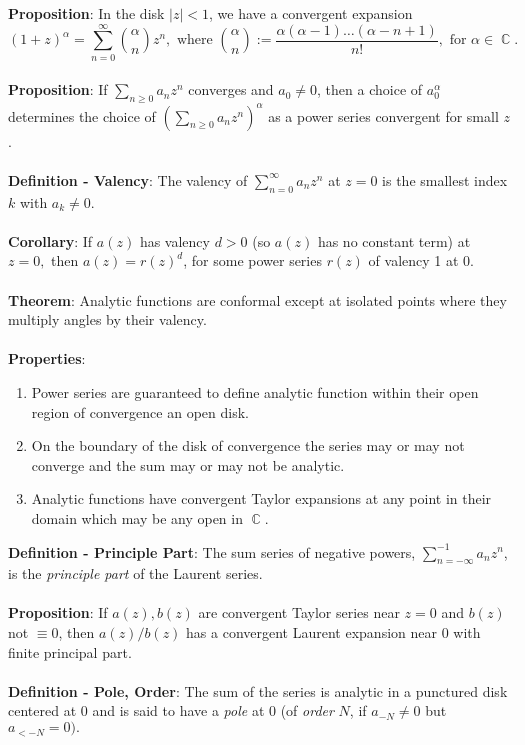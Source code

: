 \documentclass{article}
\DeclareMathOperator{\C}{\mathbb{C}}
\begin{document}
\textbf{Proposition}: In the disk $|z| < 1$, we have a convergent expansion $$(1 + z)^\alpha = \sum_{n = 0}^\infty {\alpha \choose n} z^n, \text{ where } {\alpha \choose n} := \frac{\alpha(\alpha - 1)\dots (\alpha - n + 1)}{n!}, \text{ for } \alpha \in \C.$$ \\
\textbf{Proposition}: If $\sum_{n \geq 0} a_n z^n$ converges and $a_0 \neq 0$, then a choice of $a_0^\alpha$ determines the choice of $(\sum_{n \geq 0} a_n z^n)^\alpha$ as a power series convergent for small $z$. \\ \\
\textbf{Definition - Valency}: The valency of $\sum_{n = 0}^\infty a_n z^n$ at $z = 0$ is the smallest index $k$ with $a_k \neq 0.$ \\ \\
\textbf{Corollary}: If $a(z)$ has valency $d > 0$ (so $a(z)$ has no constant term) at $z = 0,$ then $a(z) = r(z)^d$, for some power series $r(z)$ of valency 1 at 0. \\ \\
\textbf{Theorem}: Analytic functions are conformal except at
isolated points where they multiply angles by their valency. \\ \\
\textbf{Properties}: \begin{enumerate}
    \item Power series are guaranteed to define analytic function within their open region of convergence an open disk.
    \item On the boundary of the disk of convergence the series may or may not converge and the sum may or may not be analytic.
    \item Analytic functions have convergent Taylor expansions at any point in their domain which may be any open in $\C$.
\end{enumerate} $ $ \\
\textbf{Definition - Principle Part}: The sum series of negative powers, $\sum_{n = -\infty}^{-1} a_n z^n$, is the \textit{principle part} of the Laurent series. \\ \\
\textbf{Proposition}: If $a(z), b(z)$ are convergent Taylor series near $z = 0$ and $b(z)$ not $\equiv 0$, then $a(z)/b(z)$ has a convergent Laurent expansion near 0 with finite principal part. \\ \\
\textbf{Definition - Pole, Order}: The sum of the series is analytic in a punctured disk centered at 0 and is said to have a \textit{pole} at 0 (of \textit{order} $N$, if $a_{-N} \neq 0$ but $a_{<-N} = 0).$ \\ \\
\end{document}
